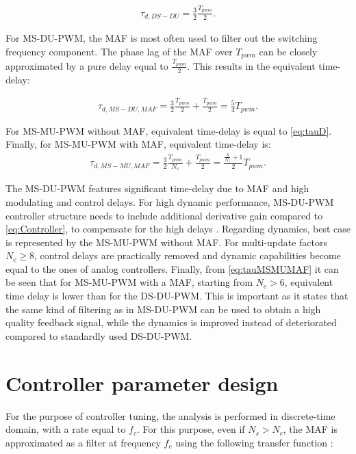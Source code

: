 \documentclass[conference]{IEEEtran}
\begin{document}
\begin{equation}
\begin{aligned}
\tau_{d,DS-DU} = \frac{3}{2} \frac{T_{pwm}}{2}.
\label{eq:tauDSDU} 
\end{aligned}    
\end{equation}

For MS-DU-PWM, the MAF is most often used to filter out the switching frequency component. The phase lag of the MAF over $T_{pwm}$ can be closely approximated by a pure delay equal to $\frac{T_{pwm}}{2}$. This results in the equivalent time-delay:

\begin{equation}
\begin{aligned}
\tau_{d,MS-DU,MAF} = \frac{3}{2} \frac{T_{pwm}}{2} + \frac{T_{pwm}}{2} = \frac{5}{4} T_{pwm}.
\label{eq:tauMSDU} 
\end{aligned}    
\end{equation}

For MS-MU-PWM without MAF, equivalent time-delay is equal to \eqref{eq:tauD}.
Finally, for MS-MU-PWM with MAF, equivalent time-delay is:
\begin{equation}
\begin{aligned}
\tau_{d,MS-MU,MAF} = \frac{3}{2} \frac{T_{pwm}}{N_c} + \frac{T_{pwm}}{2} = \frac{\frac{3}{N_c}+1}{2}T_{pwm}.
\label{eq:tauMSMUMAF} 
\end{aligned}    
\end{equation}

The MS-DU-PWM features significant time-delay due to MAF and high modulating and control delays. For high dynamic performance, MS-DU-PWM controller structure needs to include additional derivative gain compared to \eqref{eq:Controller}, to compensate for the high delays \cite{vuksa2016}. Regarding dynamics, best case is represented by the MS-MU-PWM without MAF. For multi-update factors $N_c \geq 8$, control delays are practically removed and dynamic capabilities become equal to the ones of analog controllers.
Finally, from \eqref{eq:tauMSMUMAF} it can be seen that for MS-MU-PWM with a MAF, starting from $N_c>6$, equivalent time delay is lower than for the DS-DU-PWM. This is important as it states that the same kind of filtering as in MS-DU-PWM can be used to obtain a high quality feedback signal, while the dynamics is improved instead of deteriorated compared to standardly used DS-DU-PWM.

\section{Controller parameter design}
For the purpose of controller tuning, the analysis is performed in discrete-time domain, with a rate equal to $f_c$. For this purpose, even if $N_s > N_c$, the MAF is approximated as a filter at frequency $f_c$ using the following transfer function \cite{vuksa2016}:
\end{document}
